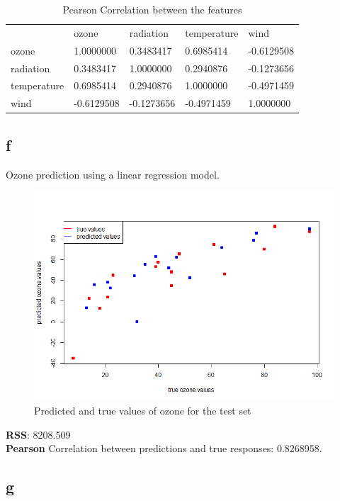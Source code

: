 \documentclass[11pt,a4paper,twoside,openright]{report}
\begin{document}
\begin{table}[H]
	\centering
	\label{tbl:pearson}
	\begin{tabular}{lllll}
		& ozone      & radiation  & temperature & wind       \\
		ozone       & 1.0000000  & 0.3483417  & 0.6985414   & -0.6129508 \\
		radiation   & 0.3483417  & 1.0000000  & 0.2940876   & -0.1273656 \\
		temperature & 0.6985414  & 0.2940876  & 1.0000000   & -0.4971459 \\
		wind        & -0.6129508 & -0.1273656 & -0.4971459  & 1.0000000 
	\end{tabular}
	\caption{Pearson Correlation between the features}
\end{table}
	
\subsection*{f}

Ozone prediction using a linear regression model. \\


\begin{figure}[H]
	\centering
	\includegraphics[width=0.7\linewidth]{"img/RplotOzone"}
	\caption{Predicted and true values of ozone for the test set}
	\label{fig:rplotozone}
\end{figure}


\textbf{RSS}: 8208.509\\

\textbf{Pearson} Correlation between predictions and true responses: 0.8268958. 




\subsection*{g}
\end{document}
